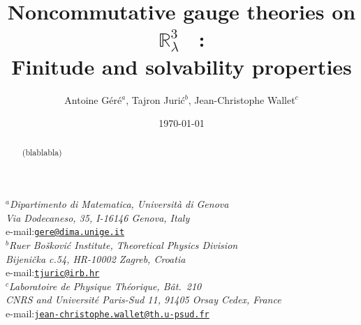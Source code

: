 \documentclass[a4paper,11pt,twoside]{article}
\makeatletter
\numberwithin{equation}{section}
\theoremstyle{nonumberplain}
\newcounter{and}
\newcommand{\institute}[1]{\newcommand{\@institute}{#1}}
\renewcommand{\maketitle}{
%
\vspace*{0.5\baselineskip}
%
{%
\center\LARGE\noindent\@title\par
}%
%
\vspace{1.5\baselineskip}
%
{%
\center\normalsize\noindent\ignorespaces\@author\par
}%
%
\vspace{0.5\baselineskip}
%
{%
\center\normalsize\ignorespaces\@institute\par
}%
%
\vspace{2\baselineskip}
%
}%
\makeatother
\begin{document}

\title{Noncommutative gauge theories on $\mathbb{R}^3_\lambda$ \ : \\
Finitude and solvability properties}

\author{Antoine G\'er\'e$^a$, Tajron Juri\'c$^b$, Jean-Christophe Wallet$^c$}

\institute{%
%
\textit{$^a$Dipartimento di Matematica, Universit\`a di Genova\\
Via Dodecaneso, 35, I-16146 Genova, Italy}\\
e-mail:\href{mailto:gere@dima.unige.it}{\texttt{gere@dima.unige.it}}\\[1ex]%
%
\textit{$^b$Ru\dj er Bo\v{s}kovi\'c Institute, Theoretical Physics Division\\
Bijeni\v{c}ka c.54, HR-10002 Zagreb, Croatia}\\
e-mail:\href{mailto:tjuric@irb.hr}{\texttt{tjuric@irb.hr}}\\[1ex]%
%
\textit{$^c$Laboratoire de Physique Th\'eorique, B\^at.\ 210\\
CNRS and Universit\'e Paris-Sud 11,  91405 Orsay Cedex, France}\\
e-mail:\href{mailto:jean-christophe.wallet@th.u-psud.fr}{\texttt{jean-christophe.wallet@th.u-psud.fr}}\\[1ex]%
%
}%

\date{\today}

\maketitle


\begin{abstract} 
(blablabla)
\end{abstract}





\end{document}
